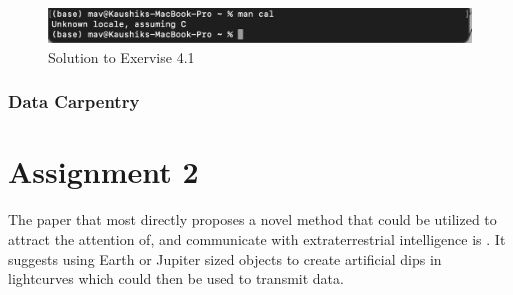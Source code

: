 \documentclass[floatfix, aps]{revtex4-2}
\begin{document}
\begin{figure}[H]
	\centering
	\includegraphics[width=0.75\linewidth]{Exercise 4.1 - 2}
	\caption{Solution to Exervise 4.1}
\end{figure}

\subsubsection{Data Carpentry}

\section{Assignment 2}

The paper that most directly proposes a novel method that could be utilized to attract the attention of, and communicate with extraterrestrial intelligence is \cite{Arnold_2005}. It suggests using Earth or Jupiter sized objects to create artificial dips in lightcurves which could then be used to transmit data. 



\end{document}
